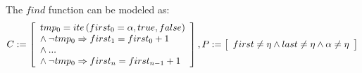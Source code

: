 \documentclass[a4paper]{llncs}
\begin{document}
{%

The $find$ function can be modeled as:
%
\begin{equation}
\label{quantifier-free-formulae-find}
C := \left [ \begin{array}{ll}
            tmp_{0} = ite\left(first_{0} = \alpha, true,  false\right) \\
            \wedge \:\neg tmp_{0} \Rightarrow first_{1} = first_{0} + 1 \\
            \wedge \:... \\
            \wedge \:\neg tmp_{0} \Rightarrow first_{n} = first_{n-1} + 1 \\
              \end{array} \right ],  \\
P := \left [ \begin{array}{ll}
            first \neq \eta \wedge last \neq \eta \wedge \alpha \neq \eta \\
              \end{array} \right ]  \\
\end{equation}
%


}
\end{document}

